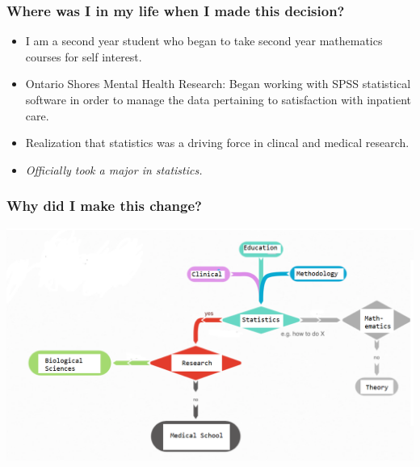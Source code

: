 \documentclass{beamer}
\begin{document}
\begin{frame}
\frametitle{\textbf{Where} was I in my life when I made this decision?}
\begin{itemize}
	\item I am a second year student who began to take second year mathematics courses for self interest. 
	\item Ontario Shores Mental Health Research: Began working with SPSS statistical software in order to manage the data pertaining to satisfaction with inpatient care. 
	\item Realization that statistics was a driving force in clincal and medical research. 
	\item \textit{Officially took a major in statistics.}
\end{itemize}


\end{frame}

\begin{frame}
	\frametitle{\textbf{Why} did I make this change?}
	
		\begin{center}
		\includegraphics[width=1.0\linewidth]{map.png}
		\begin{figure}[H]
		\end{figure}
	\end{center}
	
\end{frame}

\end{document}
